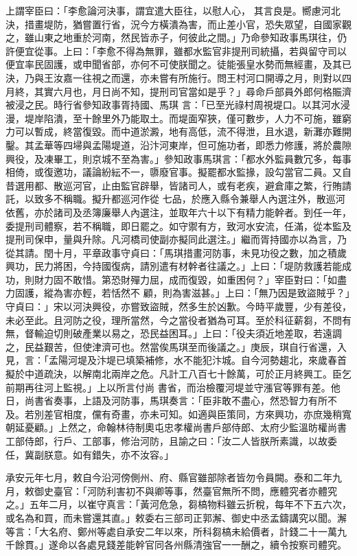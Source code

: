 \begin{pinyinscope}
 上謂宰臣曰：「李愈論河決事，謂宜遣大臣往，以慰人心，
 其言良是。嚮慮河北決，措畫堤防，猶嘗置行省，況今方橫潰為害，而止差小官，恐失眾望，自國家觀之，雖山東之地重於河南，然民皆赤子，何彼此之間。」乃命參知政事馬琪往，仍許便宜從事。上曰：「李愈不得為無罪，雖都水監官非提刑司統攝，若與留守司以便宜率民固護，或申聞省部，亦何不可使朕聞之。徒能張皇水勢而無經畫，及其已決，乃與王汝嘉一往視之而還，亦未嘗有所施行。問王村河口開導之月，則對以四月終，其實六月也，月日尚不知，提刑司官當如是乎？」尋命戶部員外郎何格賑濟被浸之民。時行省參知政事胥持國、馬琪
 言：「已至光祿村周視堤口。以其河水浸漫，堤岸陷潰，至十餘里外乃能取土。而堤面窄狹，僅可數步，人力不可施，雖窮力可以暫成，終當復毀。而中道淤澱，地有高低，流不得泄，且水退，新灘亦難開鑿。其孟華等四埽與孟陽堤道，沿汴河東岸，但可施功者，即悉力修護，將於農隙興役，及凍畢工，則京城不至為害。」參知政事馬琪言：「都水外監員數冗多，每事相倚，或復邀功，議論紛紜不一，隳廢官事。擬罷都水監掾，設勾當官二員。又自昔選用都、散巡河官，止由監官辟舉，皆諸司人，或有老疾，避倉庫之繁，行賄請託，以致多不稱職。擬升都巡河作從
 七品，於應入縣令兼舉人內選注外，散巡河依舊，亦於諸司及丞簿廉舉人內選注，並取年六十以下有精力能幹者。到任一年，委提刑司體察，若不稱職，即日罷之。如守禦有方，致河水安流，任滿，從本監及提刑司保申，量與升除。凡河橋司使副亦擬同此選注。」繼而胥持國亦以為言，乃從其請。閏十月，平章政事守貞曰：「馬琪措畫河防事，未見功役之數，加之積歲興功，民力將困，今持國復病，請別遣有材幹者往議之。」上曰：「堤防救護若能成功，則財力固不敢惜。第恐財殫力屈，成而復毀，如重困何？」宰臣對曰：「如盡力固護，縱為害亦輕，若恬然不
 顧，則為害滋甚。」上曰：「無乃因是致盜賊乎？」守貞曰：」宋以河決興役，亦嘗致盜賊，然多生於凶歉。今時平歲豐，少有差役，未必至此。且河防之役，理所當然，今之當役者猶為可耳。至於科征薪芻，不問有無，督輸迫切則破產業以易之，恐民益困耳。」上曰：「役夫須近地差取，若遠調之，民益艱苦，但使津濟可也。然當俟馬琪至而後議之。」庚辰，琪自行省還，入見，言：「孟陽河堤及汴堤已填築補修，水不能犯汴城。自今河勢趨北，來歲春首擬於中道疏決，以解南北兩岸之危。凡計工八百七十餘萬，可於正月終興工。臣乞前期再往河上監視。」上以所言付尚
 書省，而治檢覆河堤並守漲官等罪有差。他日，尚書省奏事，上語及河防事，馬琪奏言：「臣非敢不盡心，然恐智力有所不及。若別差官相度，儻有奇畫，亦未可知。如適與臣策同，方來興功，亦庶幾稍寬朝延憂顧。」上然之，命翰林待制奧屯忠孝權尚書戶部侍郎、太府少監溫昉權尚書工部侍郎，行戶、工部事，修治河防，且諭之曰：「汝二人皆朕所素識，以故委任，冀副朕意。如有錯失，亦不汝容。」



 承安元年七月，敕自今沿河傍側州、府、縣官雖部除者皆勿令員闕。泰和二年九月，敕御史臺官：「河防利害初不與卿等事，然臺官無所不問，應體究者亦體究
 之。」五年二月，以崔守真言：「黃河危急，芻槁物料雖云折稅，每年不下五六次，或名為和買，而未嘗還其直。」敕委右三部司正郭澥、御史中丞孟鑄講究以聞。澥等言：「大名府、鄭州等處自承安二年以來，所科芻槁未給價者，計錢二十一萬九千餘貫。」遂命以各處見錢差能幹官同各州縣清強官一一酬之，續令按察司體究。




\end{pinyinscope}
